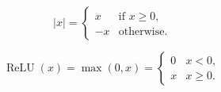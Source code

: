 \documentclass{article}
\begin{document}
\begin{equation}
  |x| =
  \begin{cases}
    x  & \text{if } x \ge 0, \\
    -x & \text{otherwise.}
  \end{cases}
\end{equation}

\begin{equation}
  \operatorname{ReLU}(x) = \max(0, x) =
  \begin{cases}
    0 & x < 0, \\
    x & x \ge 0.
  \end{cases}
\end{equation}
\end{document}
